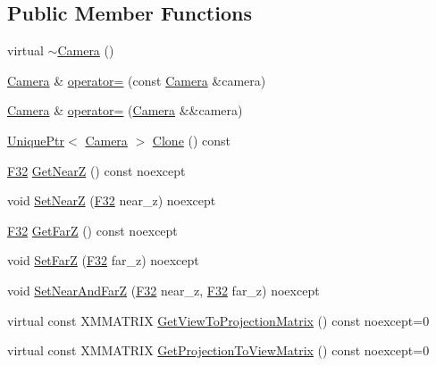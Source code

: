 \subsection*{Public Member Functions}
\begin{DoxyCompactItemize}
\item 
virtual \hyperlink{classmage_1_1_camera_aa4718c93578d160299bdc24039cc256f}{$\sim$\+Camera} ()
\item 
\hyperlink{classmage_1_1_camera}{Camera} \& \hyperlink{classmage_1_1_camera_a9ae561f9cc0ed0dd855ee1d824dad090}{operator=} (const \hyperlink{classmage_1_1_camera}{Camera} \&camera)
\item 
\hyperlink{classmage_1_1_camera}{Camera} \& \hyperlink{classmage_1_1_camera_a83e33f57394e85eee58745eb8e05b282}{operator=} (\hyperlink{classmage_1_1_camera}{Camera} \&\&camera)
\item 
\hyperlink{namespacemage_a3316d7143a973e37adf1110f2e80ca31}{Unique\+Ptr}$<$ \hyperlink{classmage_1_1_camera}{Camera} $>$ \hyperlink{classmage_1_1_camera_a830e9a071449f1026fd43fcd19577e6c}{Clone} () const
\item 
\hyperlink{namespacemage_aa97e833b45f06d60a0a9c4fc22ae02c0}{F32} \hyperlink{classmage_1_1_camera_add4054d66911dd183cdec85eda77b4a1}{Get\+NearZ} () const noexcept
\item 
void \hyperlink{classmage_1_1_camera_a404c336596263f7b55f4ff2e5097f8e9}{Set\+NearZ} (\hyperlink{namespacemage_aa97e833b45f06d60a0a9c4fc22ae02c0}{F32} near\+\_\+z) noexcept
\item 
\hyperlink{namespacemage_aa97e833b45f06d60a0a9c4fc22ae02c0}{F32} \hyperlink{classmage_1_1_camera_a47e6801d228891453540b0c1e787724a}{Get\+FarZ} () const noexcept
\item 
void \hyperlink{classmage_1_1_camera_aa49995ef824eeb807656921406d248a5}{Set\+FarZ} (\hyperlink{namespacemage_aa97e833b45f06d60a0a9c4fc22ae02c0}{F32} far\+\_\+z) noexcept
\item 
void \hyperlink{classmage_1_1_camera_aa075b0f6f30376217c0058a70df9d845}{Set\+Near\+And\+FarZ} (\hyperlink{namespacemage_aa97e833b45f06d60a0a9c4fc22ae02c0}{F32} near\+\_\+z, \hyperlink{namespacemage_aa97e833b45f06d60a0a9c4fc22ae02c0}{F32} far\+\_\+z) noexcept
\item 
virtual const X\+M\+M\+A\+T\+R\+IX \hyperlink{classmage_1_1_camera_ad3e8380ba9718a983f72d753d08f556e}{Get\+View\+To\+Projection\+Matrix} () const noexcept=0
\item 
virtual const X\+M\+M\+A\+T\+R\+IX \hyperlink{classmage_1_1_camera_a7a919b85084c79786a65c6df8872f6f1}{Get\+Projection\+To\+View\+Matrix} () const noexcept=0

\end{DoxyCompactItemize}
